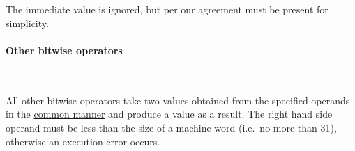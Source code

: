 \paragraph{}\

The immediate value is ignored, but per our agreement must be present for simplicity.

\vspace{-0.35cm}

\paragraph{Other bitwise operators}\

All other bitwise operators take two  values obtained from
the specified operands in the \hyperlink{types:twos_complement}{common manner}
and produce a  value as a result.
The right hand side operand must be less than the size of a machine word
(i.e.\ no more than 31), otherwise an execution error occurs.
